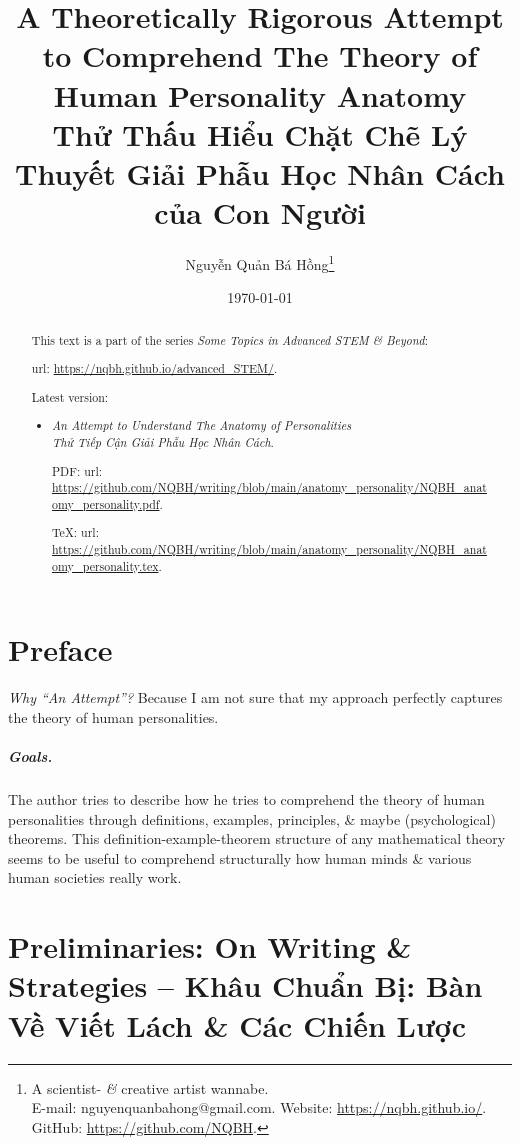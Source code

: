 \documentclass{report}
\title{A Theoretically Rigorous Attempt to Comprehend The Theory of Human Personality Anatomy\\\vspace{1cm} Thử Thấu Hiểu Chặt Chẽ Lý Thuyết Giải Phẫu Học Nhân Cách của Con Người}
\author{Nguyễn Quản Bá Hồng\footnote{A scientist- {\it\&} creative artist wannabe.\\E-mail: {\sf nguyenquanbahong@gmail.com}. Website: \url{https://nqbh.github.io/}. GitHub: \url{https://github.com/NQBH}.}}
\date{\today}
\begin{document}
\maketitle
\begin{abstract}
	This text is a part of the series {\it Some Topics in Advanced STEM \& Beyond}:
	
	{\sc url}: \url{https://nqbh.github.io/advanced_STEM/}.
	
	Latest version:
	\begin{itemize}
		\item {\it An Attempt to Understand The Anatomy of Personalities\\Thử Tiếp Cận Giải Phẫu Học Nhân Cách}.
		
		PDF: {\sc url}: \url{https://github.com/NQBH/writing/blob/main/anatomy_personality/NQBH_anatomy_personality.pdf}.
		
		\TeX: {\sc url}: \url{https://github.com/NQBH/writing/blob/main/anatomy_personality/NQBH_anatomy_personality.tex}.
	\end{itemize}
\end{abstract}
\tableofcontents


\chapter{Preface}
{\it Why ``An Attempt''?} Because I am not sure that my approach perfectly captures the theory of human personalities.

\paragraph{Goals.} The author tries to describe how he tries to comprehend the theory of human personalities through definitions, examples, principles, \& maybe (psychological) theorems. This definition-example-theorem structure of any mathematical theory seems to be useful to comprehend structurally how human minds \& various human societies really work.


\chapter{Preliminaries: On Writing \& Strategies -- Khâu Chuẩn Bị: Bàn Về Viết Lách \& Các Chiến Lược}
\end{document}
